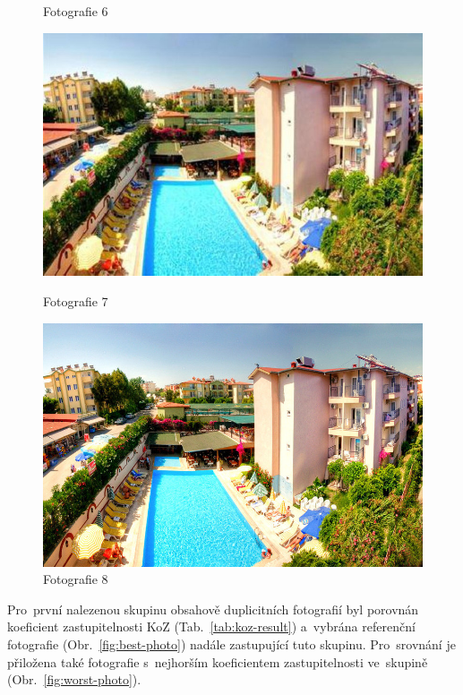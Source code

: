 \begin{figure}[!htb]
	\caption{Fotografie 6}\label{fig:img06}
	\endminipage\hfill
	\includegraphics[width=\linewidth]{graphics/kop/aa07.png}
	\caption{Fotografie 7}\label{fig:img07}
	\endminipage\hfill
	\includegraphics[width=\linewidth]{graphics/kop/aa08.png}
	\caption{Fotografie 8}\label{fig:img08}
	\endminipage\hfill
\end{figure}

Pro~první nalezenou skupinu obsahově duplicitních fotografií byl porovnán koeficient zastupitelnosti KoZ (Tab.~\ref{tab:koz-result}) a~vybrána referenční fotografie (Obr.~\ref{fig:best-photo}) nadále zastupující tuto skupinu. Pro~srovnání je přiložena také fotografie s~nejhorším koeficientem zastupitelnosti ve~skupině (Obr.~\ref{fig:worst-photo}).

